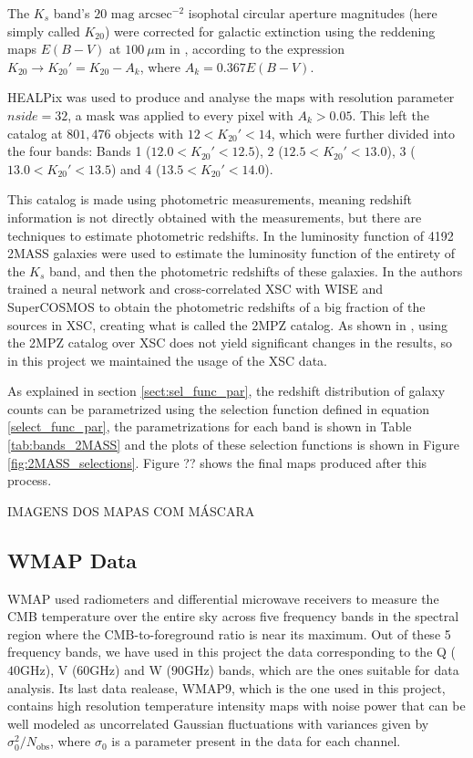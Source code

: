 \documentclass[openany,a4paper,12pt,oneside]{book}
\begin{document}
\begin{spacing}{1.5}
The $K_s$ band's $20 \text{ mag arcsec}^{-2}$ isophotal circular aperture magnitudes (here simply called $K_{20}$) were corrected for galactic extinction using the reddening maps $E(B-V)$ at $\SI{100}{\mu \meter}$ in \cite{Schlegel_1998}, according to the expression $K_{20} \rightarrow K_{20}'=K_{20}-A_k$, where $A_k=0.367E(B-V)$.

HEALPix was used to produce and analyse the maps with resolution parameter $nside=32$, a mask was applied to every pixel with $A_k>0.05$. This left the catalog at $801,476$ objects with $12<K_{20}'<14$, which were further divided into the four bands: Bands 1 ($12.0<K_{20}'<12.5$), 2 ($12.5<K_{20}'<13.0$), 3 ($13.0<K_{20}'<13.5$) and 4 ($13.5<K_{20}'<14.0$). 

This catalog is made using photometric measurements, meaning redshift information is not directly obtained with the measurements, but there are techniques to estimate photometric redshifts. In \cite{K20_lum_func} the luminosity function of 4192 2MASS galaxies were used to estimate the luminosity function of the entirety of the $K_s$ band, and then the photometric redshifts of these galaxies. In \cite{2MPZ} the authors trained a neural network and cross-correlated XSC with WISE\cite{WISE} and SuperCOSMOS\cite{SuperCOSMOS} to obtain the photometric redshifts of a big fraction of the sources in XSC, creating what is called the 2MPZ catalog. As shown in \cite{Moura-Santos_2016}, using the 2MPZ catalog over XSC does not yield significant changes in the results, so in this project we maintained the usage of the XSC data.

As explained in section \ref{sect:sel_func_par}, the redshift distribution of galaxy counts can be parametrized using the selection function defined in equation \eqref{select_func_par}, the parametrizations for each band is shown in Table \ref{tab:bands_2MASS} and the plots of these selection functions is shown in Figure \ref{fig:2MASS_selections}. Figure ?? shows the final maps produced after this process.

IMAGENS DOS MAPAS COM MÁSCARA


\subsection{WMAP Data}

WMAP used radiometers and differential microwave receivers to measure the CMB temperature over the entire sky across five frequency bands in the spectral region where the
CMB-to-foreground ratio is near its maximum\cite{WMAP_data}. Out of these 5 frequency bands, we have used in this project the data corresponding to the Q ($40\text{GHz}$), V ($60\text{GHz}$) and W ($90\text{GHz}$) bands, which are the ones suitable for data analysis. Its last data realease, WMAP9, which is the one used in this project, contains high resolution temperature intensity maps with noise power that can be well modeled as uncorrelated Gaussian fluctuations with variances given by $\sigma_0^2/N_\text{obs}$, where $\sigma_0$ is a parameter present in the data for each channel.


\end{spacing}
\end{document}
